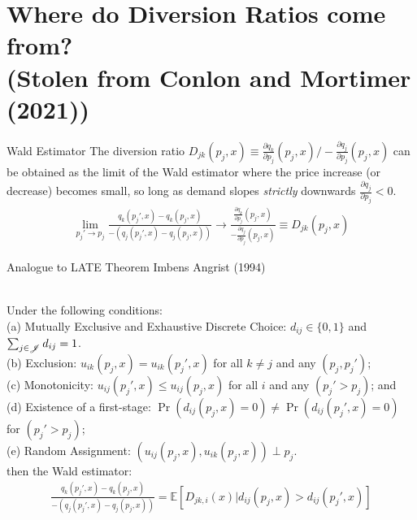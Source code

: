 \documentclass[aspectratio=169,10pt]{beamer}
\begin{document}
\section{Where do Diversion Ratios come from?\\ (Stolen from Conlon and Mortimer (2021))}


\begin{frame}{Wald Estimator}
The diversion ratio $D_{jk}(p_j,x) \equiv\frac{\partial q_k}{\partial p_j}(p_j,x)/-\frac{\partial q_j}{\partial p_j}(p_j,x)$ can be obtained as the limit of the Wald estimator where the price increase (or decrease) becomes small, so long as demand slopes \textit{strictly} downwards $\frac{\partial q_j}{\partial p_j} <0$.
\begin{align*}                               
\lim_{p_j' \rightarrow p_j} \frac{q_k(p_j',x) - q_k(p_j,x)}{-(q_j(p_j',x) - q_j(p_j,x))} \rightarrow \frac{\frac{\partial q_k}{\partial p_j}(p_j,x)}{-\frac{\partial q_j}{\partial p_j}(p_j,x)} \equiv D_{jk}(p_j,x)
\end{align*}
\end{frame}

\begin{frame}{Analogue to LATE Theorem Imbens Angrist (1994)}
\begin{theorem}\ \\
\label{prop:late}
Under the following conditions:\\ 
(a) Mutually Exclusive and Exhaustive Discrete Choice: $d_{ij} \in \{0,1\}$ and $\sum_{j \in \mathscr{J}} d_{ij}=1$.\\
(b) Exclusion: $u_{ik}(p_j,x)=u_{ik}(p_j',x)$ for all $k \neq j$ and any $(p_j, p_j')$; \\
(c) Monotonicity: $u_{ij}(p_j',x) \leq u_{ij}(p_j,x)$ for all $i$ and any $(p_j' > p_{j})$; and \\
(d) Existence of a first-stage: $\Pr(d_{ij}(p_j,x)=0) \neq \Pr(d_{ij}(p_j',x)=0) $ for $(p_j' > p_{j})$; \\
(e) Random Assignment: $(u_{ij}(p_j,x),u_{ik}(p_j,x)) \perp p_j$. \\
\noindent
then the Wald estimator:
\begin{align*}
 \frac{q_k(p_j',x) - q_k(p_j,x)}{-\left(q_j(p_j',x) - q_j(p_j,x)\right)}=\mathbb{E}[D_{jk,i}(x) | d_{ij}(p_j,x) > d_{ij}(p_j',x)]
\end{align*}
\end{theorem}
\end{frame}
\end{document}
